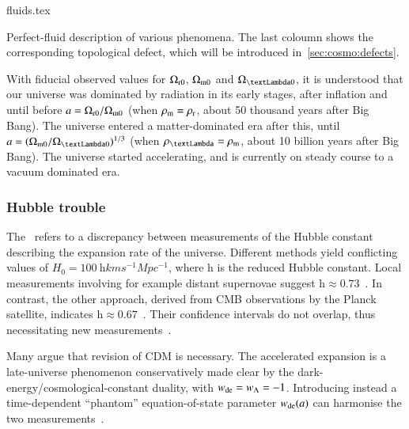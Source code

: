\begin{table}[h]
    {{fluids.tex}
    \caption{Perfect-fluid description of various phenomena. The last coloumn shows the corresponding topological defect, which will be introduced in~\cref{sec:cosmo:defects}.}
    \label{tab:GR:lcdm:fluids}}
\end{table}

With fiducial observed values for $\Omega_\mathrm{r0}$, $\Omega_\mathrm{m0}$ and $\Omega_{\text{\textLambda}0}$, it is understood that our universe was dominated by radiation in its early stages, after inflation and until before $a=\Omega_\mathrm{r0}/\Omega_\mathrm{m0}$ (when $\rho_\mathrm{m}=\rho_\mathrm{r}$, about 50 thousand years after Big Bang). The universe entered a matter-dominated era after this, until $a=(\Omega\ped{m0}/\Omega_{\text{\textLambda}0})^{1/3}$ (when $\rho_{\text{\textLambda}}=\rho\ped{m}$, about 10 billion years after Big Bang). The universe started accelerating, and is currently on steady course to a vacuum dominated era. 


\subsubsection{Hubble trouble}
    The~ refers to a discrepancy between measurements of the Hubble constant describing the expansion rate of the universe. Different methods yield conflicting values of $H_0 = 100~ \mathrm{h} \unit{km} \unit{s^{-1}} \unit{Mpc^{-1}}$, where $\mathrm{h}$ is the reduced Hubble constant. Local measurements involving for example distant supernovae suggest $\mathrm{h} \approx 0.73$~\citep[e.g.][]{maggioreGravitationalWavesVol2018}. In contrast, the other approach, derived from CMB observations by the Planck satellite, indicates $\mathrm{h}\approx 0.67$~\citep[e.g.][]{maggioreGravitationalWavesVol2018}. Their confidence intervals do not overlap, thus necessitating new measurements~\citep[e.g.][]{maggioreGravitationalWavesVol2018}. %


    Many argue that revision of \textLambda{}CDM is necessary. The accelerated expansion is a late-universe phenomenon conservatively made clear by the dark-energy/cosmological-constant duality, with $w_\mathrm{de}=w_{\Lambda}=-1$. %
    Introducing instead a time-dependent ``phantom'' equation-of-state parameter $w_\mathrm{de}(a)$ can harmonise the two measurements~\citep{maggioreGravitationalWavesVol2018}. %







